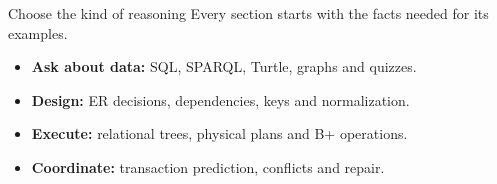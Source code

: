 \begin{frame}[t]{Choose the kind of reasoning}
Every section starts with the facts needed for its examples.
\medskip
\begin{itemize}
\item \textbf{Ask about data:} SQL, SPARQL, Turtle, graphs and quizzes.
\item \textbf{Design:} ER decisions, dependencies, keys and normalization.
\item \textbf{Execute:} relational trees, physical plans and B+ operations.
\item \textbf{Coordinate:} transaction prediction, conflicts and repair.
\end{itemize}
\end{frame}
